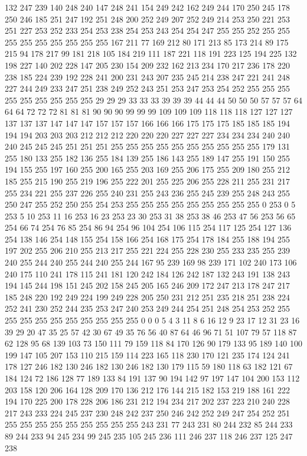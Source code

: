 132 247 239 140 248 240 147 248 241 154 249 242 162 249 244 170 250 245 178 250 246 185 251 247 192 251 248 200 252 249 207 252 249 214 253 250 221 253 251 227 253 252 233 254 253 238 254 253 243 254 254 247 255 255 252 255 255 255 255 255 255 255 255 255 167 211 77 169 212 80 171 213 85 173 214 89 175 215 94 178 217 99 181 218 105 184 219 111 187 221 118 191 223 125 194 225 132 198 227 140 202 228 147 205 230 154 209 232 162 213 234 170 217 236 178 220 238 185 224 239 192 228 241 200 231 243 207 235 245 214 238 247 221 241 248 227 244 249 233 247 251 238 249 252 243 251 253 247 253 254 252 255 255 255 255 255 255 255 255 255 29 29 29 33 33 33 39 39 39 44 44 44 50 50 50 57 57 57 64 64 64 72 72 72 81 81 81 90 90 90 99 99 99 109 109 109 118 118 118 127 127 127 137 137 137 147 147 147 157 157 157 166 166 166 175 175 175 185 185 185 194 194 194 203 203 203 212 212 212 220 220 220 227 227 227 234 234 234 240 240 240 245 245 245 251 251 251 255 255 255 255 255 255 255 255 255 
255 179 131 255 180 133 255 182 136 255 184 139 255 186 143 255 189 147 255 191 150 255 194 155 255 197 160 255 200 165 255 203 169 255 206 175 255 209 180 255 212 185 255 215 190 255 219 196 255 222 201 255 225 206 255 228 211 255 231 217 255 234 221 255 237 226 255 240 231 255 243 236 255 245 239 255 248 243 255 250 247 255 252 250 255 254 253 255 255 255 255 255 255 255 255 255 0 253 0 5 253 5 10 253 11 16 253 16 23 253 23 30 253 31 38 253 38 46 253 47 56 253 56 65 254 66 74 254 76 85 254 86 94 254 96 104 254 106 115 254 117 125 254 127 136 254 138 146 254 148 155 254 158 166 254 168 175 254 178 184 255 188 194 255 197 202 255 206 210 255 213 217 255 221 224 255 228 230 255 233 235 255 239 240 255 244 240 255 244 240 255 244 167 95 239 169 98 239 171 102 240 173 106 240 175 110 241 178 115 241 181 120 242 184 126 242 187 132 243 191 138 243 194 145 244 198 151 245 202 158 245 205 165 246 209 172 247 213 178 247 217 185 248 220 192 249 224 199 249 228 205 250 231 212 251 235 
218 251 238 224 252 241 230 252 244 235 253 247 240 253 249 244 254 251 248 254 253 252 255 255 255 255 255 255 255 255 255 255 0 0 0 5 4 3 11 8 6 16 12 9 23 17 12 31 23 16 39 29 20 47 35 25 57 42 30 67 49 35 76 56 40 87 64 46 96 71 51 107 79 57 118 87 62 128 95 68 139 103 73 150 111 79 159 118 84 170 126 90 179 133 95 189 140 100 199 147 105 207 153 110 215 159 114 223 165 118 230 170 121 235 174 124 241 178 127 246 182 130 246 182 130 246 182 130 179 115 59 180 118 63 182 121 67 184 124 72 186 128 77 189 133 84 191 137 90 194 142 97 197 147 104 200 153 112 203 158 120 206 164 128 209 170 136 212 176 144 215 182 153 219 188 161 222 194 170 225 200 178 228 206 186 231 212 194 234 217 202 237 223 210 240 228 217 243 233 224 245 237 230 248 242 237 250 246 242 252 249 247 254 252 251 255 255 255 255 255 255 255 255 255 243 231 77 243 231 80 244 232 85 244 233 89 244 233 94 245 234 99 245 235 105 245 236 111 246 237 118 246 237 125 247 238 

